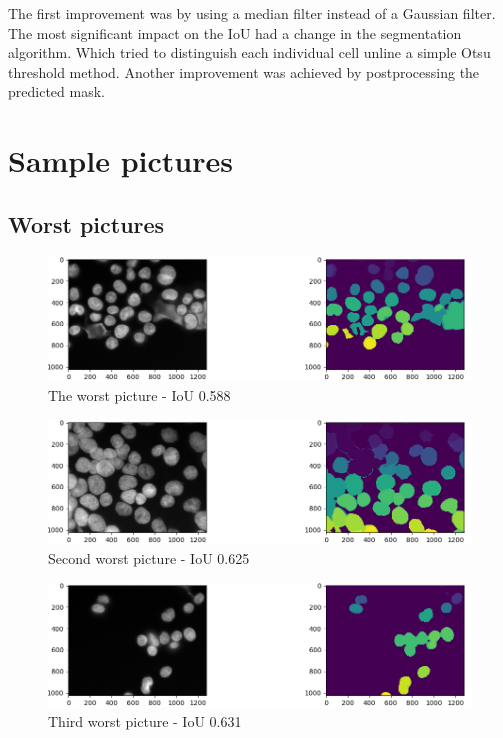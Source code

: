 \documentclass{article}
\begin{document}
The first improvement was by using a median filter instead of a Gaussian filter. The most significant impact on the IoU had a change in the segmentation algorithm. Which tried to distinguish each individual cell unline a simple Otsu threshold method. Another improvement was achieved by postprocessing the predicted mask. 

\newpage
\section{Sample pictures}


\subsection{Worst pictures}
\begin{figure}[H]
\centering
\includegraphics[width=\textwidth]{figures/1_worst.png}
\caption{The worst picture - IoU 0.588}
\end{figure}

\begin{figure}[H]
\centering
\includegraphics[width=\textwidth]{figures/2_worst.png}
\caption{Second worst picture - IoU 0.625}
\end{figure}


\begin{figure}[H]
\centering
\includegraphics[width=\textwidth]{figures/3_worst.png}
\caption{Third worst picture - IoU 0.631}
\end{figure}
\end{document}
